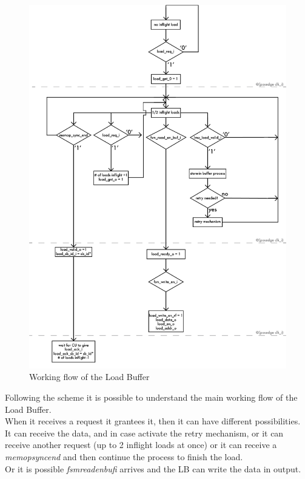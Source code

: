 \newpage
\begin{figure}[H]
    \centering
    \includegraphics[scale = 0.8]{Chapter_2/img/lb-flow.png}
    \caption{Working flow of the Load Buffer}
    \label{lb-flow}
\end{figure}

Following the scheme it is possible to understand the main working flow of the Load Buffer.\\
When it receives a request it grantees it, then it can have different possibilities.\\
It can receive the data, and in case activate the retry mechanism, or it can receive another request (up to 2 inflight loads at once) or it can receive a \emph{memop\+sync\+end} and then continue the process to finish the load.\\
Or it is possible \emph{fsm\+read\+en\+buf\+i} arrives and the LB can write the data in output.\\


